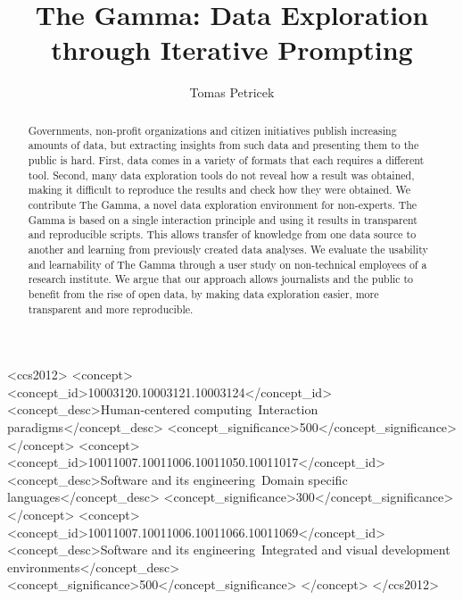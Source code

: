 \documentclass[manuscript,review,anonymous]{acmart}
\begin{document}
\title{The Gamma: Data Exploration through Iterative Prompting}

\author{Tomas Petricek}

\begin{abstract}
  Governments, non-profit organizations and citizen initiatives publish increasing amounts of
  data, but extracting insights from such data and presenting them to the public is hard.
  First, data comes in a variety of formats that each requires a different tool. Second, many
  data exploration tools do not reveal how a result was obtained, making it difficult to reproduce
  the results and check how they were obtained.
  We contribute The Gamma, a novel data exploration environment for non-experts. The Gamma is based
  on a single interaction principle and using it results in transparent and reproducible scripts.
  This allows transfer of knowledge from one data source to another and
  learning from previously created data analyses. We evaluate the usability and learnability of
  The Gamma through a user study on non-technical employees of a research institute.
  We argue that our approach allows journalists and the public to benefit from the rise
  of open data, by making data exploration easier, more transparent and more reproducible.

\end{abstract}

\begin{CCSXML}
<ccs2012>
   <concept>
       <concept_id>10003120.10003121.10003124</concept_id>
       <concept_desc>Human-centered computing~Interaction paradigms</concept_desc>
       <concept_significance>500</concept_significance>
       </concept>
   <concept>
       <concept_id>10011007.10011006.10011050.10011017</concept_id>
       <concept_desc>Software and its engineering~Domain specific languages</concept_desc>
       <concept_significance>300</concept_significance>
       </concept>
   <concept>
       <concept_id>10011007.10011006.10011066.10011069</concept_id>
       <concept_desc>Software and its engineering~Integrated and visual development environments</concept_desc>
       <concept_significance>500</concept_significance>
       </concept>
 </ccs2012>
\end{CCSXML}

\end{document}

